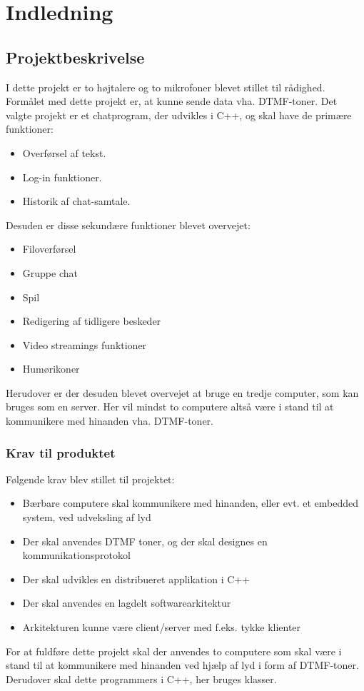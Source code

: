 \section{Indledning}
\subsection{Projektbeskrivelse}
I dette projekt er to højtalere og to mikrofoner blevet stillet til rådighed. Formålet med dette projekt er, at kunne sende data vha. DTMF-toner.
\newline
Det valgte projekt er et chatprogram, der udvikles i C++, og skal have de primære funktioner:
\begin{itemize}
	\item Overførsel af tekst.
	\item Log-in funktioner.
	\item Historik af chat-samtale.
\end{itemize}

Desuden er disse sekundære funktioner blevet overvejet:
\begin{itemize}
	\item Filoverførsel
	\item Gruppe chat
	\item Spil
	\item Redigering af tidligere beskeder
	\item Video streamings funktioner
	\item Humørikoner
\end{itemize}

Herudover er der desuden blevet overvejet at bruge en tredje computer, som kan bruges som en server.
Her vil mindst to computere altså være i stand til at kommunikere med hinanden vha. DTMF-toner.

\subsubsection{Krav til produktet}
Følgende krav blev stillet til projektet:
\begin{itemize}
	\item Bærbare computere skal kommunikere med hinanden, eller evt. et embedded system, ved	udveksling af lyd
	\item Der skal anvendes DTMF toner, og der skal designes en kommunikationsprotokol
	\item Der skal udvikles en distribueret applikation i C++
	\item Der skal anvendes en lagdelt softwarearkitektur
	\item Arkitekturen kunne være client/server med f.eks. tykke klienter
\end{itemize}
For at fuldføre dette projekt skal der anvendes to computere som skal være i stand til at kommunikere med hinanden ved hjælp af lyd i form af DTMF-toner. Derudover skal dette programmers i C++, her bruges klasser.

